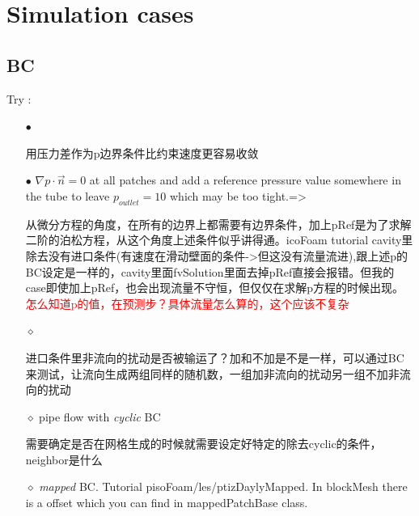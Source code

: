 \documentclass[a4paper,10pt]{article}
\begin{document}
\section{Simulation cases}
\subsection{BC}
Try : \\
\begin{itemize}
\item[$\bullet$] \begin{CJK*}{UTF8}{gkai} 用压力差作为p边界条件比约束速度更容易收敛 \end{CJK*}

\item[$\bullet$] $\nabla p \cdot \vec{n}=0$ at all patches and add a reference pressure value somewhere in the tube to leave $p_{outlet}=10$ which may be too tight.=> \begin{CJK*}{UTF8}{gkai} 从微分方程的角度，在所有的边界上都需要有边界条件，加上pRef是为了求解二阶的泊松方程，从这个角度上述条件似乎讲得通。icoFoam tutorial cavity里除去没有进口条件(有速度在滑动壁面的条件->但这没有流量流进),跟上述p的BC设定是一样的，cavity里面fvSolution里面去掉pRef直接会报错。但我的case即使加上pRef，也会出现流量不守恒，但仅仅在求解p方程的时候出现。\textcolor{red}{怎么知道p的值，在预测步？具体流量怎么算的，这个应该不复杂} \end{CJK*} 

\item[$\diamond$] \begin{CJK*}{UTF8}{gkai} 进口条件里非流向的扰动是否被输运了？加和不加是不是一样，可以通过BC来测试，让流向生成两组同样的随机数，一组加非流向的扰动另一组不加非流向的扰动 \end{CJK*}

\item[$\diamond$] pipe flow with \textit{cyclic} BC \begin{CJK*}{UTF8}{gkai} 需要确定是否在网格生成的时候就需要设定好特定的除去cyclic的条件，neighbor是什么 \end{CJK*}

\item[$\diamond$] \textit{mapped} BC. Tutorial pisoFoam/les/ptizDaylyMapped. In blockMesh there is a offset which you can find in mappedPatchBase class.

\end{itemize}
\end{document}
